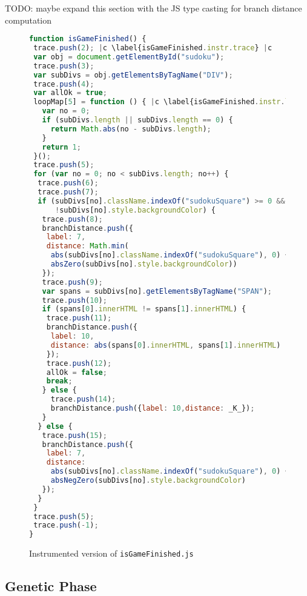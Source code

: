 \documentclass[sigconf,review, anonymous]{acmart}
\begin{document}
TODO: maybe expand this section with the JS type casting for branch distance computation 

\begin{figure}[t]
  \begin{lstlisting}[style=htmlcssjs,language=JavaScript]
function isGameFinished() {
 trace.push(2); |c \label{isGameFinished.instr.trace} |c
 var obj = document.getElementById("sudoku");
 trace.push(3);
 var subDivs = obj.getElementsByTagName("DIV");
 trace.push(4);
 var allOk = true;
 loopMap[5] = function () { |c \label{isGameFinished.instr.loopMap} |c
   var no = 0;
   if (subDivs.length || subDivs.length == 0) {
     return Math.abs(no - subDivs.length);
   }
   return 1;
 }();
 trace.push(5);
 for (var no = 0; no < subDivs.length; no++) {
  trace.push(6);
  trace.push(7);
  if (subDivs[no].className.indexOf("sudokuSquare") >= 0 &&
      !subDivs[no].style.backgroundColor) {
   trace.push(8);
   branchDistance.push({ 
    label: 7, 
    distance: Math.min(
     abs(subDivs[no].className.indexOf("sudokuSquare"), 0) + _K_, 
     absZero(subDivs[no].style.backgroundColor))
   });
   trace.push(9);
   var spans = subDivs[no].getElementsByTagName("SPAN");
   trace.push(10);
   if (spans[0].innerHTML != spans[1].innerHTML) {
    trace.push(11);
    branchDistance.push({
     label: 10,
     distance: abs(spans[0].innerHTML, spans[1].innerHTML)
    });
    trace.push(12);
    allOk = false;
    break;
   } else {
     trace.push(14);
     branchDistance.push({label: 10,distance: _K_});
   }
  } else {
   trace.push(15);
   branchDistance.push({
    label: 7,
    distance: 
     abs(subDivs[no].className.indexOf("sudokuSquare"), 0) + 
     absNegZero(subDivs[no].style.backgroundColor)
   });
  }
 }
 trace.push(5);
 trace.push(-1);
}
\end{lstlisting}
  \caption{Instrumented version of \texttt{isGameFinished.js} }
  \label{code.isGameFinished.instr}
\end{figure}

\subsection{Genetic Phase}
\label{sub.sec.genetic.phase}
\end{document}
